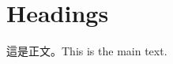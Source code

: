 \documentclass[a4paper,12pt]{article}
\begin{document}
\maketitle

\section{Headings}

這是正文。This is the main text.
\end{document}
